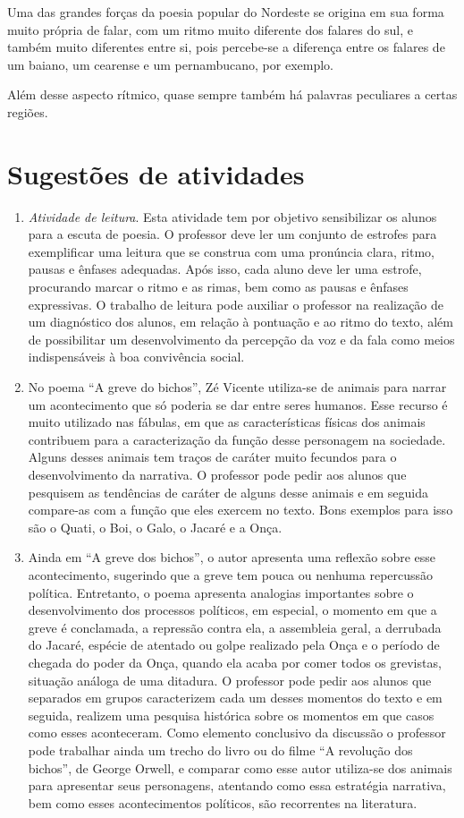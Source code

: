 Uma das grandes forças da poesia popular do Nordeste se origina em sua
forma muito própria de falar, com um ritmo muito diferente dos falares
do sul, e também muito diferentes entre si, pois percebe-se a diferença
entre os falares de um baiano, um cearense e um pernambucano, por
exemplo.

Além desse aspecto rítmico, quase sempre também há palavras peculiares a
certas regiões. 
\pagebreak
\section{Sugestões de atividades}
\begin{enumerate}

\item \textit{Atividade de leitura}. Esta atividade tem por objetivo sensibilizar os
alunos para a escuta de poesia. O professor deve ler um conjunto de
estrofes para exemplificar uma leitura que se construa com uma
pronúncia clara, ritmo, pausas e ênfases adequadas. Após isso, cada aluno deve
ler uma estrofe, procurando marcar o ritmo e as rimas, bem como as
pausas e ênfases expressivas. O trabalho de leitura pode auxiliar o
professor na realização de um diagnóstico dos alunos, em relação à
pontuação e ao ritmo do texto, além de possibilitar um desenvolvimento
da percepção da voz e da fala como meios indispensáveis à boa
convivência social.


\item No poema ``A greve do bichos'', Zé
Vicente utiliza-se de animais para narrar um acontecimento que só
poderia se dar entre seres humanos. Esse recurso é muito utilizado
nas fábulas, em que as características físicas dos animais contribuem
para a caracterização da função desse personagem na sociedade. Alguns
desses animais tem traços de caráter muito fecundos para o
desenvolvimento da narrativa. O professor pode pedir aos alunos que
pesquisem as tendências de caráter de alguns desse animais e em seguida
compare-as com a função que eles exercem no texto. Bons exemplos para
isso são o Quati, o Boi, o Galo, o Jacaré e a Onça. 


\item Ainda em ``A greve dos bichos'', o
autor apresenta uma reflexão sobre esse acontecimento, sugerindo que a
greve tem pouca ou nenhuma repercussão política. Entretanto, o poema
apresenta analogias importantes sobre o desenvolvimento dos processos
políticos, em especial, o momento em que a greve é conclamada, a
repressão contra ela, a assembleia geral, a derrubada do Jacaré,
espécie de atentado ou golpe realizado pela Onça e o período de chegada
do poder da Onça, quando ela acaba por comer todos os grevistas,
situação análoga de uma ditadura. O professor pode pedir aos alunos que
separados em grupos caracterizem cada um desses momentos do texto e em
seguida, realizem uma pesquisa histórica sobre os momentos em que casos
como esses aconteceram. Como elemento conclusivo da discussão o
professor pode trabalhar ainda um trecho do livro ou do filme
``A revolução dos bichos'', de George
Orwell, e comparar como esse autor utiliza-se dos animais para
apresentar seus personagens, atentando como essa estratégia narrativa,
bem como esses acontecimentos políticos, são recorrentes na literatura. 



\end{enumerate}
